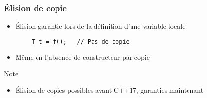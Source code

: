 \documentclass[C++.tex]{subfiles}
\begin{document}
\begin{frame}[fragile]
	\frametitle{Élision de copie}
	\begin{itemize}
		\item Élision garantie lors de la définition d'une variable locale
	\end{itemize}

	\begin{verbatim}
		T t = f();   // Pas de copie
	\end{verbatim}

	\begin{itemize}
		\item Même en l'absence de constructeur par copie
	\end{itemize}

	\begin{block}{Note}
		\begin{itemize}
			\item Élision de copies possibles avant C++17, garanties maintenant
		\end{itemize}
	\end{block}

\end{frame}
\end{document}
